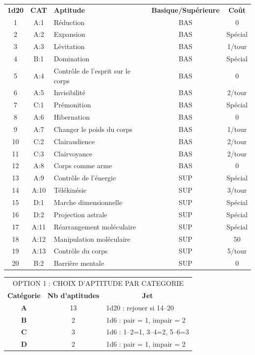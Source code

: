 \documentclass[11pt]{article}
\begin{document}
{\begin{tabular}{cclcc}
\textbf{1d20}    & \textbf{CAT}   & \textbf{Aptitude} & \textbf{Basique/Supérieure} & \textbf{Coût}  \\
1       & A:1   & Réduction                 & BAS & 0  \\
2       & A:2   & Expansion                 & BAS & Spécial    \\
3       & A:3   & Lévitation                & BAS & 1/tour    \\
4       & B:1   & Domination                & BAS & Spécial   \\
5       & A:4   & Contrôle de l'esprit sur le corps & BAS & 0  \\
6       & A:5   & Invisibilité              & BAS & 2/tour  \\
7       & C:1   & Prémonition               & BAS & Spécial  \\
8       & A:6   & Hibernation               & BAS & 0  \\
9       & A:7   & Changer le poids du corps & BAS & 1/tour \\
10      & C:2   & Clairaudience             & BAS & 2/tour \\
11      & C:3   & Clairvoyance              & BAS & 2/tour \\
12      & A:8   & Corps comme arme          & BAS & 0 \\
13      & A:9   & Contrôle de l'énergie     & SUP & Spécial \\
14      & A:10  & Télékinésie               & SUP & 3/tour\\
15      & D:1   & Marche dimensionnelle     & SUP & Spécial\\
16      & D:2   & Projection astrale        & SUP & Spécial\\
17      & A:11  & Réarrangement moléculaire & SUP & Spécial\\
18      & A:12  & Manipulation moléculaire  & SUP & 50\\
19      & A:13  & Contrôle du corps         & SUP & 5/tour\\
20      & B:2   & Barrière mentale          & SUP & 0\\
\end{tabular}

\bigskip

\begin{tabular}{ccl}
\multicolumn{3}{c}{OPTION 1 : CHOIX D'APTITUDE PAR CATEGORIE} \\
\textbf{Catégorie} &  \textbf{Nb d'aptitudes} & \multicolumn{1}{c}{\textbf{Jet}} \\
\textbf{A} & 13 & 1d20 : rejouer si 14--20 \\
\textbf{B} & 2 & 1d6 : pair = 1, impair = 2 \\
\textbf{C} & 3 & 1d6 : 1--2=1, 3--4=2, 5--6=3 \\
\textbf{D} & 2 & 1d6 : pair = 1, impair = 2 \\
\end{tabular}




}
\end{document}
